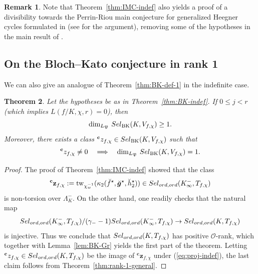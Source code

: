 \documentclass[10pt,letterpaper]{amsart}
\theoremstyle{plain}
\newtheorem{thm}{Theorem}[subsection] %
\theoremstyle{definition}
\newtheorem{rmk}[thm]{Remark}
\theoremstyle{definition}
\theoremstyle{plain}
\theoremstyle{plain}
\theoremstyle{plain}
\theoremstyle{remark}
\numberwithin{equation}{section}
\newcommand{\cc}{\mathbf{c}}
\newcommand{\Sel}{Sel}
\newcommand{\ord}{{{\rm ord},{\rm ord}}}
\def\cO{\mathcal O}
\def\Sel{{\rm Sel}}
\newcommand{\bfg}{{\boldsymbol{g}}}
\begin{document}
\begin{rmk}
Note that Theorem~\ref{thm:IMC-indef} also yields a proof of a divisibility towards the Perrin-Riou main conjecture for generalized Heegner cycles formulated in \cite{LV-kyoto} (see \cite[Thm.~5.2]{BCK-PRconj} for the argument), removing some of the hypotheses in the main result of \cite{LV-kyoto}.
\end{rmk}

\subsection{On the Bloch--Kato conjecture in rank 1}

We can also give an analogue of Theorem~\ref{thm:BK-def-1} in the indefinite case. 

\begin{thm}\label{thm:BK-indef-1}
Let the hypotheses be as in Theorem~\ref{thm:BK-indef}. If $0\leq j<r$ (which implies $L(f/K,\chi,r)=0$), then 
\[
\dim_{L_\mathfrak{P}}\,\Sel_{\mathrm{BK}}(K,V_{f,\chi})\geq 1.
\]
Moreover, there exists a class ${}^\cc z_{f,\chi}\in\Sel_{\mathrm{BK}}(K,V_{f,\chi})$ such that
\[
{}^\cc z_{f,\chi}\neq 0\quad\Longrightarrow\quad\dim_{L_\mathfrak{P}}\,\Sel_{\mathrm{BK}}(K,V_{f,\chi})=1.
\]
\end{thm}

\begin{proof}
The proof of Theorem~\ref{thm:IMC-indef} showed that the class
\[
{}^\cc\mathbf{z}_{f,\chi}:={\mathrm{tw}}_{\chi_w^{-1}}(\kappa_2(\breve{f}^\star,\breve{\bfg}^\star,\breve{h}_2^\star))\in\Sel_{\ord}(K_\infty^-,T_{f,\chi})
\]
is non-torsion over $\Lambda_K^-$. On the other hand, one readily checks that the natural map
\begin{equation}\label{eq:proj-indef}
\Sel_{\ord}(K_\infty^-,T_{f,\chi})/(\gamma_--1)\Sel_{\ord}(K_\infty^-,T_{f,\chi})\rightarrow\Sel_{\ord}(K,T_{f,\chi})
\end{equation}
is injective. Thus we conclude that $\Sel_{\ord}(K,T_{f,\chi})$ has positive $\cO$-rank, which together with  Lemma~\ref{lem:BK-Gr} yields the first part of the theorem. Letting ${}^\cc z_{f,\chi}\in\Sel_{\ord}(K,T_{f,\chi})$ be the image of ${}^\cc\mathbf{z}_{f,\chi}$ under (\ref{eq:proj-indef}), 
the last claim follows from Theorem~\ref{thm:rank-1-general}. 
\end{proof}





\newpage


\end{document}
